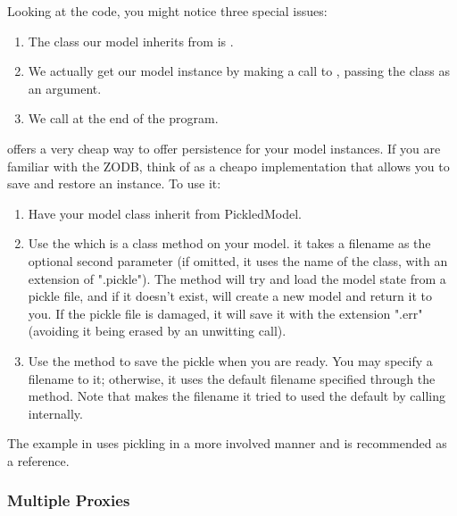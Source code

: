 \documentclass[a4paper]{howto}
\begin{document}


Looking at the code, you might notice three special issues:

\begin{enumerate}
\item The class our model inherits from is .
\item We actually get our model instance by making a call to
, passing the class  as
an argument.
\item We call  at the end of the program.
\end{enumerate}

 offers a very cheap way to offer persistence for
your model instances. If you are familiar with the ZODB, think of
 as a cheapo implementation that allows you to save
and restore an instance. To use it:

\begin{enumerate}
\item Have your model class inherit from PickledModel.

\item Use the  which is a class method on 
your model. it takes a filename as the optional second parameter (if omitted, 
it uses the name of the class, with an extension of ".pickle"). 
The method will try and load the model state from a pickle file, 
and if it doesn't exist, will create a new model and return it to you. 
If the pickle file is damaged, it will save it with the extension ".err" 
(avoiding it being erased by an unwitting  call).

\item Use the  method to save the pickle when you are
ready. You may specify a filename to it; otherwise, it uses the default
filename specified through the  method. Note that
 makes the filename it tried to used the 
default by calling  internally.
\end{enumerate}

The  example in  uses pickling in a
more involved manner and is recommended as a reference.

\subsubsection{Multiple Proxies}
\label{multipleproxies}
\end{document}
